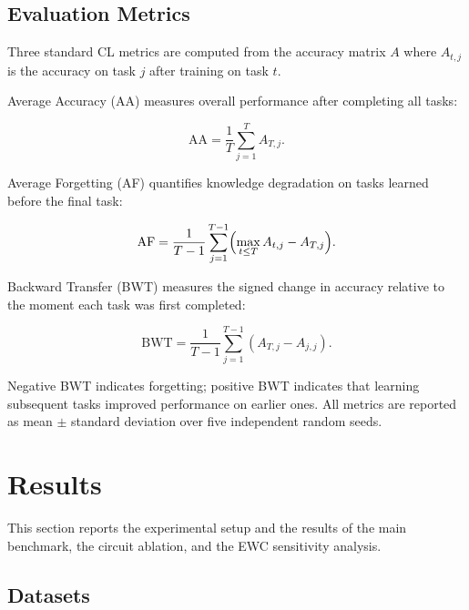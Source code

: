 \documentclass[acmlarge]{acmart}
\begin{document}
\subsection{Evaluation Metrics}
\label{subsec:metrics}

Three standard CL metrics are computed from the accuracy matrix $A$ where $A_{t,j}$ is the accuracy on task $j$ after training on task $t$.

Average Accuracy (AA) measures overall performance after completing all tasks:

\begin{equation}
\label{eq:aa}
\text{AA} = \frac{1}{T} \sum_{j=1}^{T} A_{T,j}.
\end{equation}

Average Forgetting (AF) quantifies knowledge degradation on tasks learned before the final task:

\begin{equation}
\label{eq:af}
\text{AF} = \frac{1}{T-1} \sum_{j=1}^{T-1} \Bigl( \max_{t \leq T} A_{t,j} - A_{T,j} \Bigr).
\end{equation}

Backward Transfer (BWT) measures the signed change in accuracy relative to the moment each task was first completed:

\begin{equation}
\label{eq:bwt}
\text{BWT} = \frac{1}{T-1} \sum_{j=1}^{T-1} (A_{T,j} - A_{j,j}).
\end{equation}

Negative BWT indicates forgetting; positive BWT indicates that learning subsequent tasks improved performance on earlier ones.
All metrics are reported as mean $\pm$ standard deviation over five independent random seeds.

\section{Results}
\label{sec:results}

This section reports the experimental setup and the results of the main benchmark, the circuit ablation, and the EWC sensitivity analysis.

\subsection{Datasets}
\label{subsec:datasets}
\end{document}
